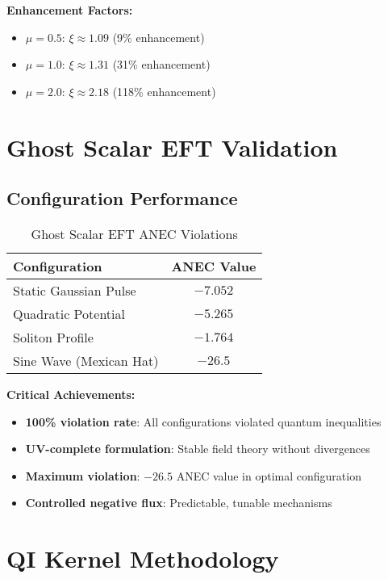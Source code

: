 \documentclass[11pt]{article}
\begin{document}
\textbf{Enhancement Factors:}
\begin{itemize}
    \item $\mu = 0.5$: $\xi \approx 1.09$ (9\% enhancement)
    \item $\mu = 1.0$: $\xi \approx 1.31$ (31\% enhancement)
    \item $\mu = 2.0$: $\xi \approx 2.18$ (118\% enhancement)
\end{itemize}

\section{Ghost Scalar EFT Validation}

\subsection{Configuration Performance}

\begin{table}[h]
\centering
\begin{tabular}{@{}lc@{}}
\toprule
\textbf{Configuration} & \textbf{ANEC Value} \\
\midrule
Static Gaussian Pulse & $-7.052$ \\
Quadratic Potential & $-5.265$ \\
Soliton Profile & $-1.764$ \\
Sine Wave (Mexican Hat) & $\mathbf{-26.5}$ \\
\bottomrule
\end{tabular}
\caption{Ghost Scalar EFT ANEC Violations}
\end{table}

\textbf{Critical Achievements:}
\begin{itemize}
    \item \textbf{100\% violation rate}: All configurations violated quantum inequalities
    \item \textbf{UV-complete formulation}: Stable field theory without divergences
    \item \textbf{Maximum violation}: $-26.5$ ANEC value in optimal configuration
    \item \textbf{Controlled negative flux}: Predictable, tunable mechanisms
\end{itemize}

\section{QI Kernel Methodology}
\end{document}
